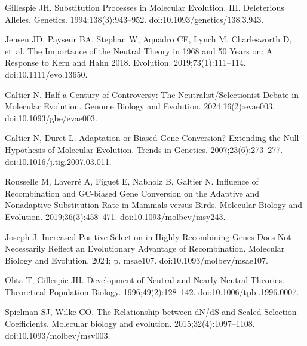 \documentclass{article}
\begin{document}
\begin{thebibliography}{10}
        Gillespie JH.
        \newblock Substitution Processes in Molecular Evolution. {{III}}.
            {{Deleterious}} Alleles.
        \newblock Genetics. 1994;138(3):943--952.
        \newblock doi:{10.1093/genetics/138.3.943}.

        Jensen JD, Payseur BA, Stephan W, Aquadro CF, Lynch M, Charlesworth D, et~al.
        \newblock The Importance of the {{Neutral Theory}} in 1968 and 50 Years on:
            {{A}} Response to {{Kern}} and {{Hahn}} 2018.
        \newblock Evolution. 2019;73(1):111--114.
        \newblock doi:{10.1111/evo.13650}.

        Galtier N.
        \newblock Half a {{Century}} of {{Controversy}}: {{The
        Neutralist}}/{{Selectionist Debate}} in {{Molecular Evolution}}.
        \newblock Genome Biology and Evolution. 2024;16(2):evae003.
        \newblock doi:{10.1093/gbe/evae003}.

        Galtier N, Duret L.
        \newblock Adaptation or Biased Gene Conversion? {{Extending}} the Null
        Hypothesis of Molecular Evolution.
        \newblock Trends in Genetics. 2007;23(6):273--277.
        \newblock doi:{10.1016/j.tig.2007.03.011}.

        Rousselle M, Laverr{\'e} A, Figuet E, Nabholz B, Galtier N.
        \newblock Influence of {{Recombination}} and {{GC-biased Gene Conversion}} on
        the {{Adaptive}} and {{Nonadaptive Substitution Rate}} in {{Mammals}} versus
            {{Birds}}.
        \newblock Molecular Biology and Evolution. 2019;36(3):458--471.
        \newblock doi:{10.1093/molbev/msy243}.

        Joseph J.
        \newblock Increased {{Positive Selection}} in {{Highly Recombining Genes Does}}
        Not {{Necessarily Reflect}} an {{Evolutionary Advantage}} of
            {{Recombination}}.
        \newblock Molecular Biology and Evolution. 2024; p. msae107.
        \newblock doi:{10.1093/molbev/msae107}.

        Ohta T, Gillespie JH.
        \newblock Development of {{Neutral}} and {{Nearly Neutral Theories}}.
        \newblock Theoretical Population Biology. 1996;49(2):128--142.
        \newblock doi:{10.1006/tpbi.1996.0007}.

        Spielman SJ, Wilke CO.
        \newblock The Relationship between {{dN}}/{{dS}} and Scaled Selection
        Coefficients.
        \newblock Molecular biology and evolution. 2015;32(4):1097--1108.
        \newblock doi:{10.1093/molbev/msv003}.


\end{thebibliography}
\end{document}
